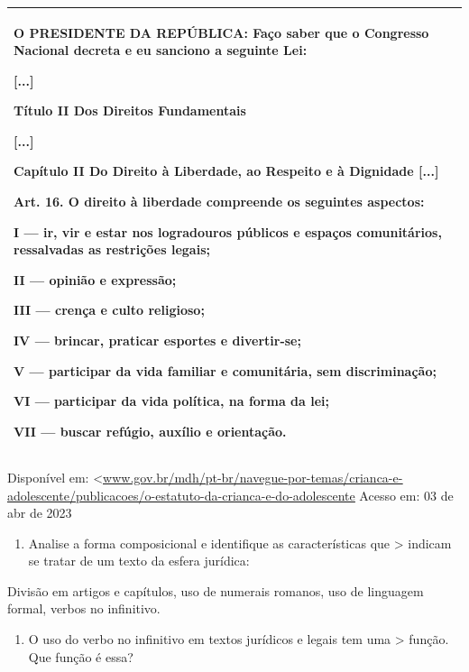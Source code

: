 \begin{longtable}[]{@{}
  >{\raggedright\arraybackslash}p{}@{}}
\toprule
\endhead
O PRESIDENTE DA REPÚBLICA: Faço saber que o Congresso Nacional decreta e
eu sanciono a seguinte Lei:

{[}...{]}

Título II Dos Direitos Fundamentais

{[}...{]}

Capítulo II Do Direito à Liberdade, ao Respeito e à Dignidade {[}...{]}

Art. 16. O direito à liberdade compreende os seguintes aspectos:

I --- ir, vir e estar nos logradouros públicos e espaços comunitários,
ressalvadas as restrições legais;

II --- opinião e expressão;

III --- crença e culto religioso;

IV --- brincar, praticar esportes e divertir-se;

V --- participar da vida familiar e comunitária, sem discriminação;

VI --- participar da vida política, na forma da lei;

VII --- buscar refúgio, auxílio e orientação. \\
\bottomrule
\end{longtable}

Disponível em:
\textless{}\href{http://www.gov.br/mdh/pt-br/navegue-por-temas/crianca-e-adolescente/publicacoes/o-estatuto-da-crianca-e-do-adolescente}{\uline{www.gov.br/mdh/pt-br/navegue-por-temas/crianca-e-adolescente/publicacoes/o-estatuto-da-crianca-e-do-adolescente}}
Acesso em: 03 de abr de 2023

\begin{enumerate}
\def\labelenumi{\arabic{enumi})}
\setcounter{enumi}{3}
\tightlist
\item
  Analise a forma composicional e identifique as características que
  \textgreater{} indicam se tratar de um texto da esfera jurídica:
\end{enumerate}

Divisão em artigos e capítulos, uso de numerais romanos, uso de
linguagem formal, verbos no infinitivo.

\begin{enumerate}
\def\labelenumi{\arabic{enumi})}
\setcounter{enumi}{4}
\tightlist
\item
  O uso do verbo no infinitivo em textos jurídicos e legais tem uma
  \textgreater{} função. Que função é essa?
\end{enumerate}

